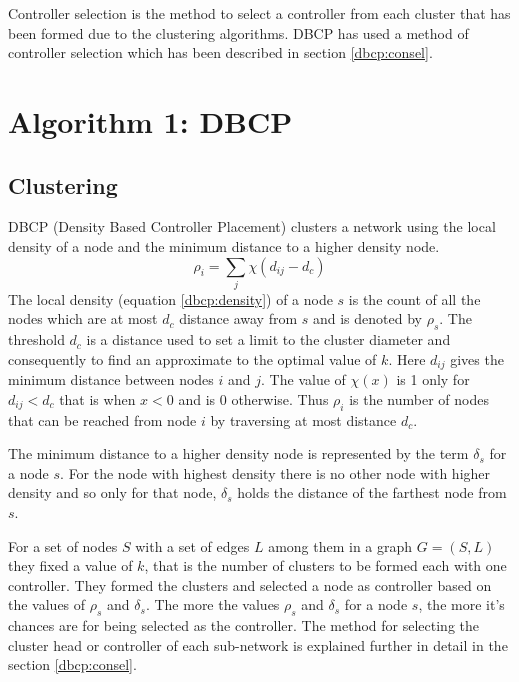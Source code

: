 \documentclass[10pt]{extarticle}
\begin{document}
	Controller selection is the method to select a controller from each cluster that has been formed due to the clustering algorithms. DBCP has used a method of controller selection which has been described in section \ref{dbcp:consel}.
	
	\section{Algorithm 1: DBCP\cite{dbcp}} \label{algo:dbcp}
	
	\subsection{Clustering} \label{dbcp:cluster}
	DBCP (Density Based Controller Placement) clusters a network using the local density of a node and the minimum distance to a higher density node.
	\begin{equation} \label{dbcp:density}
	\rho_i=\sum_j\chi(d_{ij}-d_c)
	\end{equation}
	The local density (equation \ref{dbcp:density}) of a node $s$ is the count of all the nodes which are at most $d_c$ distance away from $s$ and is denoted by $\rho_s$. The threshold $d_c$ is a distance used to set a limit to the cluster diameter and consequently to find an approximate to the optimal value of $k$.
	Here $d_{ij}$ gives the minimum distance between nodes $i$ and $j$. The value of $\chi(x)$ is 1 only for $d_{ij}<d_c$ that is when $x<0$ and is 0 otherwise. Thus $\rho_i$ is the number of nodes that can be reached from node $i$ by traversing at most distance $d_c$.
	
	The minimum distance to a higher density node is represented by the term $\delta_s$ for a node $s$. For the node with highest density there is no other node with higher density and so only for that node, $\delta_s$ holds the distance of the farthest node from $s$.
	
	For a set of nodes $S$ with a set of edges $L$ among them in a graph $G=(S,L)$ they fixed a value of $k$, that is the number of clusters to be formed each with one controller. They formed the clusters and selected a node as controller based on the values of $\rho_s$ and $\delta_s$. The more the values $\rho_s$ and $\delta_s$ for a node $s$, the more it's chances are for being selected as the controller. The method for selecting the cluster head or controller of each sub-network is explained further in detail in the section \ref{dbcp:consel}.
	
\end{document}
